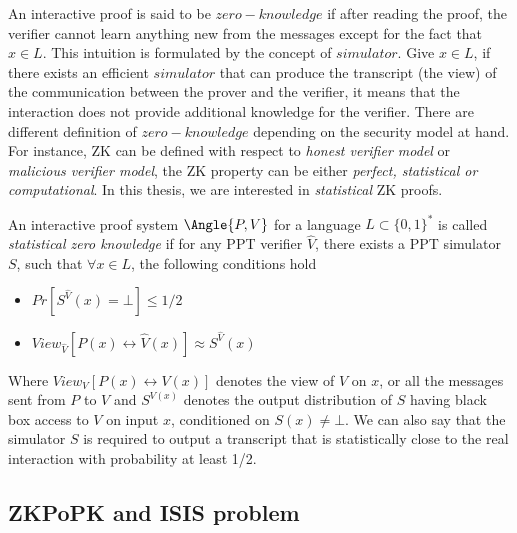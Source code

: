 An interactive proof is said to be \(zero-knowledge \) if after reading the
proof, the verifier cannot learn anything new from the messages except for the
fact that \(x \in L\). This intuition is formulated by the concept of
\(simulator\). Give \(x \in L\), if there exists an efficient \(simulator\) that
can produce the transcript (the view) of the communication between the prover
and the verifier, it means that the interaction does not provide additional
knowledge for the verifier. There are different definition of \(zero-knowledge\)
depending on the security model at hand. For instance, ZK can be defined with
respect to \textit{honest verifier model} or \textit{malicious verifier model},
the ZK property can be either \textit{perfect, statistical or computational}. In
this thesis, we are interested in \textit{statistical } ZK proofs.

\begin{definition}
   An interactive proof system \(\Angle{P,V}\) for a language
  \(L \subset \{0,1\}^{*}\) is called \textit{statistical zero knowledge } if
  for any PPT verifier \(\hat{V}\), there exists a PPT simulator \(S\), such
  that \(\forall x \in L\), the following conditions hold
  \begin{itemize}
  \item \(Pr[S^{\hat{V}}(x) = \bot] \leq 1/2\)
  \item \(View_{\hat{V}}[P(x) \leftrightarrow \hat{V}(x)] \approx S^{\hat{V}}(x)\)
  \end{itemize}
\end{definition}
Where \(View_{V}[P(x) \leftrightarrow V(x)]\) denotes the view of \(V\) on
\(x\), or all the messages sent from \(P\) to \(V\) and \(S^{V(x)}\) denotes the
output distribution of \(S\) having black box access to \(V\) on input \(x\),
conditioned on \(S(x) \neq \bot\).  We can also say that the simulator \(S\) is
required to output a transcript that is statistically close to the real
interaction with probability at least 1/2.

\subsection{ZKPoPK and ISIS problem}
\label{sec:zkpIsisi}

